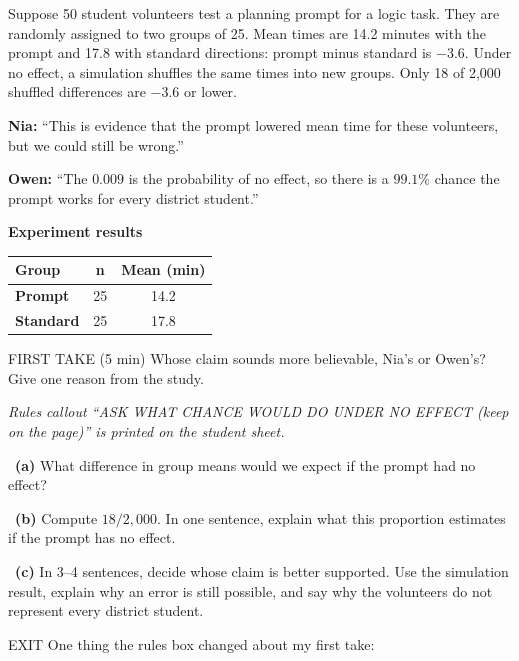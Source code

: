 \documentclass[11pt]{article}
\begin{document}
Suppose 50 student volunteers test a planning prompt for a logic task. They are randomly assigned to two groups of 25. Mean times are 14.2 minutes with the prompt and 17.8 with standard directions: prompt minus standard is $-3.6$. Under no effect, a simulation shuffles the same times into new groups. Only 18 of 2{,}000 shuffled differences are $-3.6$ or lower.\par\smallskip \textbf{Nia:} ``This is evidence that the prompt lowered mean time for these volunteers, but we could still be wrong.''\par \textbf{Owen:} ``The $0.009$ is the probability of no effect, so there is a $99.1\%$ chance the prompt works for every district student.''\par
\begin{center}
\textbf{Experiment results}\par\smallskip
\begin{tabular}{|l|c|c|}
\hline
\textbf{Group} & \textbf{n} & \textbf{Mean (min)} \\ \hline
\textbf{Prompt} & 25 & 14.2 \\ \hline
\textbf{Standard} & 25 & 17.8 \\ \hline
\end{tabular}
\end{center}
\begin{firsttakebox}{FIRST TAKE (5 min)}
Whose claim sounds more believable, Nia's or Owen's? Give one reason from the study.\par
{}
\end{firsttakebox}

\textit{Rules callout ``ASK WHAT CHANCE WOULD DO UNDER NO EFFECT (keep on the page)'' is printed on the student sheet.}\par\medskip

~\textbf{(a)} What difference in group means would we expect if the prompt had no effect?\par
{}

~\textbf{(b)} Compute $18/2{,}000$. In one sentence, explain what this proportion estimates if the prompt has no effect.\par
{}

~\textbf{(c)} In 3--4 sentences, decide whose claim is better supported. Use the simulation result, explain why an error is still possible, and say why the volunteers do not represent every district student.\par
{}

\begin{summaryexitbox}{EXIT}
One thing the rules box changed about my first take: \hrulefill
\end{summaryexitbox}
\end{document}
